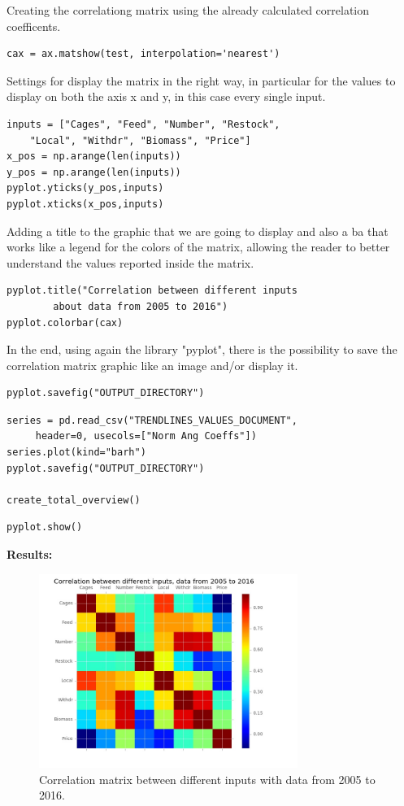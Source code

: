 Creating the correlationg matrix using the already calculated correlation coefficents.
\begin{lstlisting}
cax = ax.matshow(test, interpolation='nearest')
\end{lstlisting}

Settings for display the matrix in the right way, in particular for the values to display on both the axis x and y, in this case every single input.
\begin{lstlisting}
inputs = ["Cages", "Feed", "Number", "Restock",
	"Local", "Withdr", "Biomass", "Price"]
x_pos = np.arange(len(inputs))
y_pos = np.arange(len(inputs))
pyplot.yticks(y_pos,inputs)
pyplot.xticks(x_pos,inputs)
\end{lstlisting}

Adding a title to the graphic that we are going to display and also a ba that works like a legend for the colors of the matrix, allowing the reader to better understand the values reported inside the matrix.
\begin{lstlisting}
pyplot.title("Correlation between different inputs 
		about data from 2005 to 2016")
pyplot.colorbar(cax)
\end{lstlisting}

In the end, using again the library "pyplot", there is the possibility to save the correlation matrix graphic like an image and/or display it.
\begin{lstlisting}
pyplot.savefig("OUTPUT_DIRECTORY")
\end{lstlisting}

\begin{lstlisting}
series = pd.read_csv("TRENDLINES_VALUES_DOCUMENT",
	 header=0, usecols=["Norm Ang Coeffs"])
series.plot(kind="barh")
pyplot.savefig("OUTPUT_DIRECTORY")

create_total_overview()
\end{lstlisting}

\begin{lstlisting}
pyplot.show()
\end{lstlisting}




\textbf{Results:} \\

\begin{figure}[H]
	\centering
    \includegraphics[width=0.75\textwidth]{Files/Total_Dataset_Years_Matrix.jpg}
    \caption{Correlation matrix between different inputs with data from 2005 to 2016.}
\end{figure}


